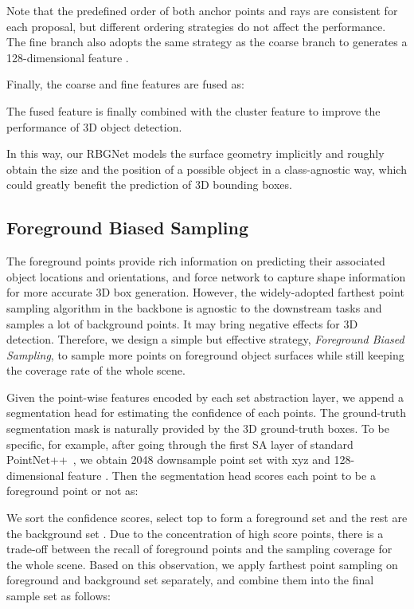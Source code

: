 \documentclass[final]{cvpr}
\begin{document}
Note that the predefined order of both anchor points and rays are consistent for each proposal, but different ordering strategies do not affect the performance. 
The fine branch also adopts the same strategy as the coarse branch to generates a 128-dimensional feature .
 
Finally, the coarse and fine features are fused as: 

The fused feature  is finally combined with the cluster feature  to improve the performance of 3D object detection.

In this way, our RBGNet models the surface geometry implicitly and roughly obtain the size and the position of a possible object in a class-agnostic way, which could greatly benefit the prediction of 3D bounding boxes.  

\subsection{Foreground Biased Sampling}\label{sec:objectsample}
The foreground points provide rich information on predicting their associated object locations and orientations, and force network to capture shape information for more accurate 3D box generation. 
However, the widely-adopted farthest point sampling algorithm in the backbone is agnostic to the downstream tasks and samples a lot of background points. It may bring negative effects for 3D detection. 
Therefore, we design a simple but effective strategy, \textit{Foreground Biased Sampling}, to sample more points on foreground object surfaces while still keeping the coverage rate of the whole scene.

Given the point-wise features encoded by each set abstraction layer, we append a segmentation head for estimating the confidence of each points. The ground-truth segmentation mask is naturally provided by the 3D ground-truth boxes. To be specific, for example, after going through the first SA layer of standard PointNet++~\cite{qi2018pointnnetplus}, we obtain 2048 downsample point set  with xyz  and 128-dimensional feature . Then the segmentation head scores each point to be a foreground point or not as: 

We sort the confidence scores, select top  to form a foreground set  and the rest are the background set . Due to the concentration of high score points, there is a trade-off between the recall of foreground points and the sampling coverage for the whole scene. Based on this observation, we apply farthest point sampling on foreground and background set separately, and combine them into the final sample set as follows:  
\end{document}
